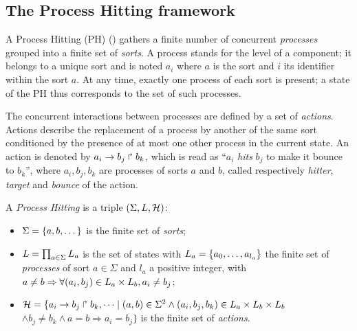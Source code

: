 \subsection{The Process Hitting framework}
\label{ssec:PH}

A Process Hitting (PH) () gathers a finite number of concurrent \emph{processes}
grouped into a finite set of \emph{sorts}.
A process stands for the level of a component;
it belongs to a unique sort and is noted $a_i$ where $a$ is the sort and $i$ its identifier within the sort $a$.
At any time, exactly one process of each sort is present; a state of the PH thus corresponds to the set of such processes.
 
The concurrent interactions between processes are defined by a set of
\emph{actions}.
Actions describe the replacement of a process by another of the same sort
conditioned by the presence of at most one other process in the current state.
An action is denoted by $a_i\rightarrow b_j\Rsh b_k$, which is read as
``$a_i$ \emph{hits} $b_j$ to make it bounce to $b_k$'',
where $a_i,b_j,b_k$ are processes of sorts $a$ and $b$,
called respectively \emph{hitter}, \emph{target} and
\emph{bounce} of the action.

\begin{definition}\label{def:PH}
A \emph{Process Hitting} is a triple $(\Sigma,L,\mathcal{H})$:
\begin{itemize}
\item $\Sigma = \{a,b,\dots\}$ is the finite set of \emph{sorts};
\item $L = \prod_{a\in\Sigma} L_a$ is the set of states with $L_a = \{a_0,\dots,a_{l_a}\}$
the finite set of \emph{processes} of sort $a\in\Sigma$ and $l_a$ a positive integer, with
	$a\neq b\Rightarrow \forall(a_i,b_j)\in L_a\times L_b,a_i\neq b_j$;
\item $\mathcal{H} = \{ a_i\rightarrow b_j\Rsh b_k, \dots \mid
					(a,b)\in\Sigma^2 \wedge (a_i,b_j,b_k)\in L_a\times L_b\times L_b$ \\
	\hspace*{2cm} $\wedge b_j\neq b_k \wedge a=b\Rightarrow a_i=b_j\}$
			is the finite set of \emph{actions}.
\end{itemize}
\end{definition}

